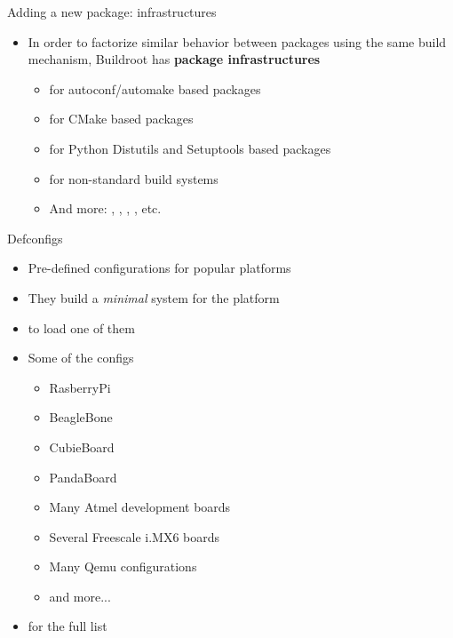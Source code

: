\documentclass[aspectratio=169,obeyspaces,spaces,hyphens,dvipsnames]{beamer}
\begin{document}
\begin{frame}{Adding a new package: infrastructures}
  \begin{itemize}
  \item In order to factorize similar behavior between packages using
    the same build mechanism, Buildroot has {\bf package
      infrastructures}
    \begin{itemize}
    \item {} for autoconf/automake based packages
    \item {} for CMake based packages
    \item {} for Python Distutils and Setuptools based packages
    \item {} for non-standard build systems
    \item And more: , ,
      , , etc.
    \end{itemize}
  \end{itemize}
\end{frame}

\begin{frame}{Defconfigs}
  \begin{itemize}
  \item Pre-defined configurations for popular platforms
  \item They build a {\em minimal} system for the platform
  \item {} to load one of them
  \item Some of the configs
    \begin{itemize}
    \item RasberryPi
    \item BeagleBone
    \item CubieBoard
    \item PandaBoard
    \item Many Atmel development boards
    \item Several Freescale i.MX6 boards
    \item Many Qemu configurations
    \item and more...
    \end{itemize}
  \item {} for the full list
  \end{itemize}
\end{frame}
\end{document}
